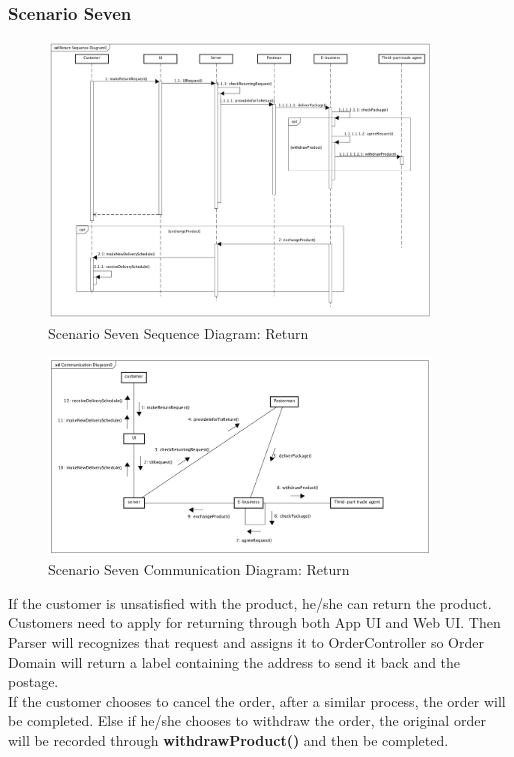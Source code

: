 \documentclass[12pt]{scrreprt}
\begin{document}
\subsubsection{Scenario Seven}
\begin{figure}[H]
  \centering\includegraphics[width=4in]{DocumentRes/7SequenceDiagram_return.png}
  \caption{Scenario Seven Sequence Diagram: Return}
\end{figure}
\begin{figure}[H]
  \centering\includegraphics[width=4in]{DocumentRes/7CommunicationDiagram_return.png}
  \caption{Scenario Seven Communication Diagram: Return}
\end{figure}
If the customer is unsatisfied with the product, he/she can return the product.
Customers need to apply for returning through both App UI and Web UI. Then
Parser will recognizes that request and assigns it to OrderController so Order
Domain will return a label containing the address to send it back and the
postage.\\
If the customer chooses to cancel the order, after a similar process, the order
will be completed. Else if he/she chooses to withdraw the order, the original
order will be recorded through \textbf{withdrawProduct()} and then be completed.
\end{document}
